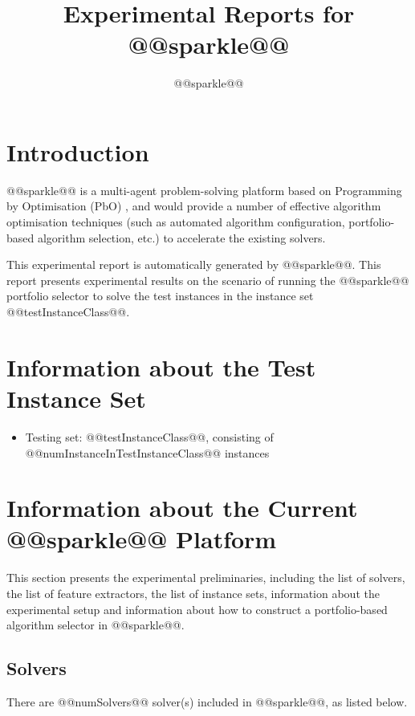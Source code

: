 \documentclass[british]{article}
\title{Experimental Reports for @@sparkle@@ }
\author{ @@sparkle@@ }
\begin{document}
\maketitle %


\section{Introduction}
\label{sec:Introduction}

@@sparkle@@ \cite{Hoos15} is a multi-agent problem-solving platform based on Programming by Optimisation (PbO) \cite{Hoos12}, and would provide a number of effective algorithm optimisation techniques (such as automated algorithm configuration, portfolio-based algorithm selection, etc.) to accelerate the existing solvers.

This experimental report is automatically generated by @@sparkle@@. This report presents experimental results on the scenario of running the @@sparkle@@ portfolio selector to solve the test instances in the instance set @@testInstanceClass@@.


\section{Information about the Test Instance Set}
\label{sec:Information_about_the_Test_Instance_Class}

\begin{itemize}
\item Testing set: @@testInstanceClass@@, consisting of @@numInstanceInTestInstanceClass@@ instances
\end{itemize}


\section{Information about the Current @@sparkle@@ Platform}
\label{sec:Information_about_Current_Sparkle}

This section presents the experimental preliminaries, including the list of solvers, the list of feature extractors, the list of instance sets, information about the experimental setup and information about how to construct a portfolio-based algorithm selector in @@sparkle@@.

\subsection{Solvers}
\label{sec:Solvers}
There are @@numSolvers@@ solver(s) included in @@sparkle@@, as listed below.
\end{document}
